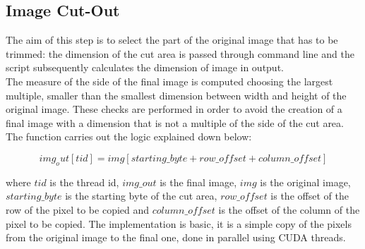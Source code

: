     \subsection{Image Cut-Out}
    The aim of this step is to select the part of the original image that has to be trimmed: 
    the dimension of the cut area is passed through command line and the script subsequently calculates the dimension of image in output.  \\ 
    The measure of the side of the final image is computed choosing the largest multiple, 
    smaller than the smallest dimension between width and height of the original image. These checks are performed in order to avoid the creation of a final 
    image with a dimension that is not a multiple of the side of the cut area.\\
    The function carries out the logic explained down below:

    \begin{equation}
        img_out[tid] = img[starting\_byte + row\_offset + column\_offset]
    \end{equation}
    
    where $tid$ is the thread id, $img\_out$ is the final image, $img$ is the original image, $starting\_byte$ is the starting byte of the cut area, 
    $row\_offset$ is the offset of the row of the pixel to be copied and $column\_offset$ is the offset of the column of the pixel to be copied.
    The implementation is basic, it is a simple copy of the pixels from the original image to the final one, done in parallel using CUDA threads.\\

